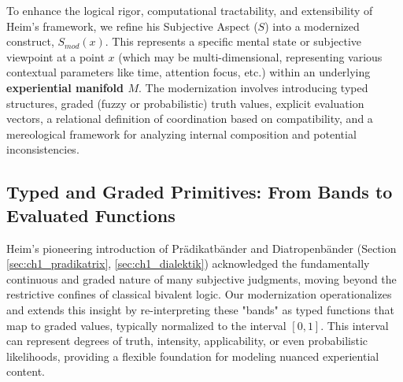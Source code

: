 \documentclass[
    12pt,              %
    a4paper,           %
    headings=normal,   %
    twoside=true,      %
    BCOR=8mm,          %
]{scrbook}
\newcommand{\subjektiveraspekt}{S}
\begin{document}
To enhance the logical rigor, computational tractability, and extensibility of Heim's framework, we refine his Subjective Aspect (\(\subjektiveraspekt\)) into a modernized construct, \(S_{mod}(x)\). This represents a specific mental state or subjective viewpoint at a point \(x\) (which may be multi-dimensional, representing various contextual parameters like time, attention focus, etc.) within an underlying \textbf{experiential manifold \(M\)}. The modernization involves introducing typed structures, graded (fuzzy or probabilistic) truth values, explicit evaluation vectors, a relational definition of coordination based on compatibility, and a mereological framework for analyzing internal composition and potential inconsistencies.

\subsection{Typed and Graded Primitives: From Bands to Evaluated Functions}
\label{sec:ch1_typed_graded_primitives} %

Heim's pioneering introduction of Prädikatbänder and Diatropenbänder (Section \ref{sec:ch1_pradikatrix}, \ref{sec:ch1_dialektik}) acknowledged the fundamentally continuous and graded nature of many subjective judgments, moving beyond the restrictive confines of classical bivalent logic. Our modernization operationalizes and extends this insight by re-interpreting these "bands" as typed functions that map to graded values, typically normalized to the interval \([0,1]\). This interval can represent degrees of truth, intensity, applicability, or even probabilistic likelihoods, providing a flexible foundation for modeling nuanced experiential content.
\end{document}
